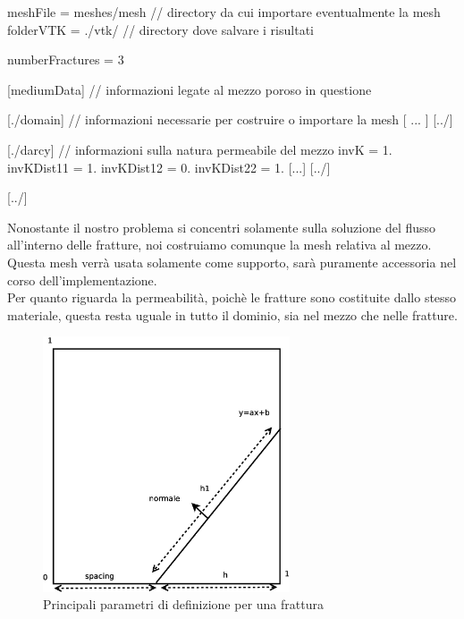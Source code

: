\begin{Code03_01}[caption={Definizione del dominio}]
meshFile = meshes/mesh		//   directory da cui importare eventualmente la mesh
folderVTK = ./vtk/				//   directory dove salvare i risultati

numberFractures = 3

[mediumData]					//   informazioni legate al mezzo poroso in questione

   [./domain]					//   informazioni necessarie per costruire o importare la mesh 
     [ ... ]
   [../]

   [./darcy]					//   informazioni sulla natura permeabile del mezzo
     invK = 1.
     invKDist11 = 1.
     invKDist12 = 0.
     invKDist22 = 1.
     [...]	
   [../]

[../]

\end{Code03_01}

\par \noindent Nonostante il nostro problema si concentri solamente sulla soluzione del flusso all'interno delle fratture, noi costruiamo comunque la mesh relativa al mezzo. Questa mesh verrà usata solamente come supporto, sarà puramente accessoria nel corso dell'implementazione. \\
 \noindent Per quanto riguarda la permeabilità, poichè le fratture sono costituite dallo stesso materiale, questa resta uguale in tutto il dominio, sia nel mezzo che nelle fratture. 

\begin{figure}[htbp]
\begin{center}
\includegraphics[width=0.65\textwidth]{img/cap2/mesh.eps}
\caption{Principali parametri di definizione per una frattura}
\end{center}
\end{figure}

